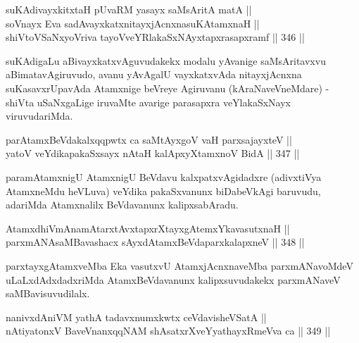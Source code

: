 
\begin{shl}
suKAdivayxkitxtaH pUvaRM yasayx saMsAritA matA || \\
soV\s nayx Eva sadAvayxkatxnitayxjAcnxnasuKAtamxnaH || \\
shiVtoVSaNxyoVriva tayoVveYRlakaSxNAyxtapxrasapxramf \hfill || 346 ||  
\end{shl}

\begin{artha}
suKAdigaLu aBivayxkatxvAguvudakekx modalu yAvanige saMsAritavxvu
aBimatavAgiruvudo, avanu yAvAgalU vayxkatxvAda nitayxjAcnxna
suKasavxrUpavAda Atamxnige beVreye Agiruvanu (kAraNaveVneMdare) -
shiVta uSaNxgaLige iruvaMte avarige parasapxra veYlakaSxNayx
viruvudariMda.
\end{artha}

\begin{shl}
parAtamxBeVdakalxqqpwtx ca saMtAyxgoV vaH parxsajayxteV || \\
yatoV veYdikapakaSxsayx nAtaH kalApxyX\s \s tamxnoV BidA \hfill || 347 ||  
\end{shl}

\begin{artha}
paramAtamxnigU AtamxnigU BeVdavu kalxpatxvAgidadxre (adivxtiVya
AtamxneMdu heVLuva) veYdika pakaSxvanunx biDabeVkAgi baruvudu,
adariMda Atamxnalilx BeVdavanunx kalipxsabAradu.
\end{artha}


\begin{shl}
AtamxdhiVmAnamAtarxtAvxtapxrXtayxgAtemxYkavasutxnaH || \\
parxmANAsaMBavashacx sAyxdAtamxBeVdaparxkalapxneV \hfill || 348 ||  
\end{shl}

\begin{artha}
parxtayxgAtamxveMba Eka vasutxvU AtamxjAcnxnaveMba parxmANavoMdeV
uLaLxdAdxdadxriMda AtamxBeVdavanunx kalipxsuvudakekx parxmANaveV
saMBavisuvudilalx.
\end{artha}

\begin{shl}
nanivxdAniVM yathA tadavxnumxkwtx ceVdavisheVSatA || \\
nAtiyatonxV BaveVnanxqqNAM shAsatxrXveYyathayxRmeVva ca \hfill || 349 ||  
\end{shl}

